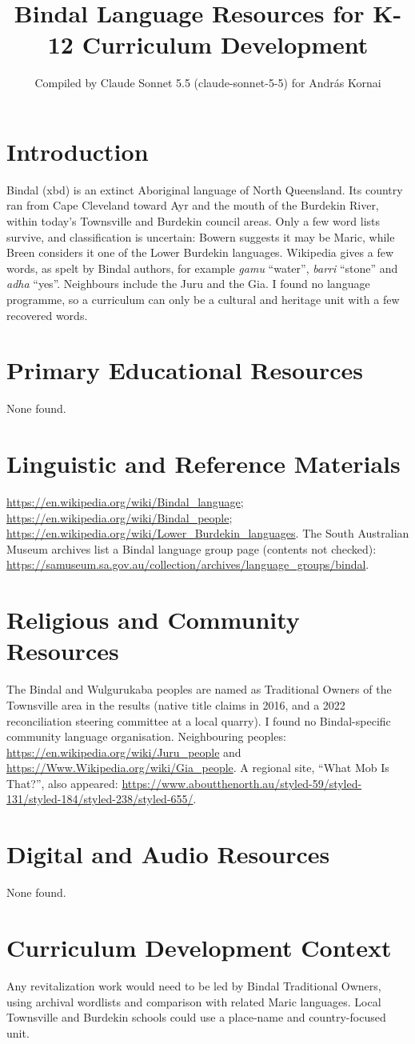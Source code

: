 \documentclass[12pt]{article}
\title{Bindal Language Resources for K-12 Curriculum Development}
\author{Compiled by Claude Sonnet 5.5 (claude-sonnet-5-5) for Andr\'as Kornai}
\date{}
\begin{document}
\maketitle

\section{Introduction}
Bindal (xbd) is an extinct Aboriginal language of North Queensland. Its country ran from Cape Cleveland toward Ayr and the mouth of the Burdekin River, within today's Townsville and Burdekin council areas. Only a few word lists survive, and classification is uncertain: Bowern suggests it may be Maric, while Breen considers it one of the Lower Burdekin languages. Wikipedia gives a few words, as spelt by Bindal authors, for example \emph{gamu} ``water'', \emph{barri} ``stone'' and \emph{adha} ``yes''. Neighbours include the Juru and the Gia. I found no language programme, so a curriculum can only be a cultural and heritage unit with a few recovered words.

\section{Primary Educational Resources}
None found.

\section{Linguistic and Reference Materials}
\url{https://en.wikipedia.org/wiki/Bindal_language}; \url{https://en.wikipedia.org/wiki/Bindal_people}; \url{https://en.wikipedia.org/wiki/Lower_Burdekin_languages}. The South Australian Museum archives list a Bindal language group page (contents not checked): \url{https://samuseum.sa.gov.au/collection/archives/language_groups/bindal}.

\section{Religious and Community Resources}
The Bindal and Wulgurukaba peoples are named as Traditional Owners of the Townsville area in the results (native title claims in 2016, and a 2022 reconciliation steering committee at a local quarry). I found no Bindal-specific community language organisation. Neighbouring peoples: \url{https://en.wikipedia.org/wiki/Juru_people} and \url{https://Www.Wikipedia.org/wiki/Gia_people}. A regional site, ``What Mob Is That?'', also appeared: \url{https://www.aboutthenorth.au/styled-59/styled-131/styled-184/styled-238/styled-655/}.

\section{Digital and Audio Resources}
None found.

\section{Curriculum Development Context}
Any revitalization work would need to be led by Bindal Traditional Owners, using archival wordlists and comparison with related Maric languages. Local Townsville and Burdekin schools could use a place-name and country-focused unit.
\end{document}
